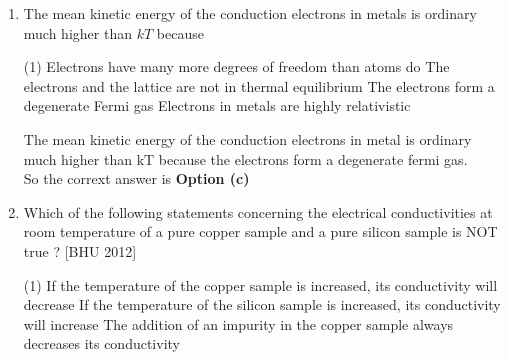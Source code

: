 \begin{enumerate}
\begin{tasks}
\begin{figure}[H]
			\centering
			\texttt{[image: CE-7]}
		\end{figure}
		\task[\textbf{d.}] \begin{figure}[H]
			\centering
			\texttt{[image: CE-8]}
		\end{figure}
	\end{tasks}
	\begin{answer}
		$$
		\begin{aligned}
		\begin{array}{c|ccc}
		A & B & C & y \\
		\hline 0 & 0 & 0 & 0 \\
		0 & 0 & 1 & 0 \\
		0 & 1 & 0 & 0 \\
		1 & 0 & 0 & 1
		\end{array}
	\end{aligned}
	$$
	Only option (d) will give such output.\\
		So the corrext answer is \textbf{Option (d)}
	\end{answer}
	\item The mean kinetic energy of the conduction electrons in metals is ordinary much higher than $k T$ because
	 \begin{tasks}(1)
		\task[\textbf{a.}]Electrons have many more degrees of freedom than atoms do
		\task[\textbf{b.}] The electrons and the lattice are not in thermal equilibrium
		\task[\textbf{c.}]The electrons form a degenerate Fermi gas
		\task[\textbf{d.}] Electrons in metals are highly relativistic
	\end{tasks}
\begin{answer}
	The mean kinetic energy of the conduction electrons in metal is ordinary much higher than $\mathrm{kT}$ because the electrons form a degenerate fermi gas.\\
		So the corrext answer is \textbf{Option (c)}
\end{answer}
\item Which of the following statements concerning the electrical conductivities at room temperature of a pure copper sample and a pure silicon sample is NOT true ?
	[BHU 2012]
	 \begin{tasks}(1)
		\task[\textbf{a.}]If the temperature of the copper sample is increased, its conductivity will decrease
		\task[\textbf{b.}]If the temperature of the silicon sample is increased, its conductivity will increase
		\task[\textbf{c.}] The addition of an impurity in the copper sample always decreases its conductivity

\end{tasks}
\end{enumerate}
